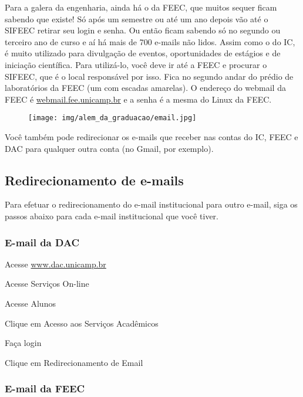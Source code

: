 Para a galera da engenharia, ainda há o da FEEC, que muitos sequer ficam
sabendo que existe! Só após um semestre ou até um ano depois vão até o SIFEEC
retirar seu login e senha. Ou então ficam sabendo só no segundo ou terceiro ano
de curso e aí há mais de 700 e-mails não lidos. Assim como o do IC, é muito
utilizado para divulgação de eventos, oportunidades de estágios e de iniciação
científica. Para utilizá-lo, você deve ir até a FEEC e procurar o SIFEEC, que é
o local responsável por isso. Fica no segundo andar do prédio de laboratórios
da FEEC (um com escadas amarelas). O endereço do webmail da FEEC é
\url{webmail.fee.unicamp.br} e a senha é a mesma do Linux da FEEC.

\begin{figure}[b!]
    \centering
    \texttt{[image: img/alem\_da\_graduacao/email.jpg]}
\end{figure}

Você também pode redirecionar os e-mails que receber nas contas do IC, FEEC e
DAC para qualquer outra conta (no Gmail, por exemplo).

\subsection{Redirecionamento de e-mails}
Para efetuar o redirecionamento do e-mail institucional para outro e-mail, siga
os passos abaixo para cada e-mail institucional que você tiver.

\subsubsection{E-mail da DAC}

\begin{compactenumerate}
    \item  Acesse \url{www.dac.unicamp.br}
    \item  Acesse Serviços On-line
    \item  Acesse Alunos
    \item  Clique em Acesso aos Serviços Acadêmicos
    \item  Faça login
    \item  Clique em Redirecionamento de Email
\end{compactenumerate}

\subsubsection{E-mail da FEEC}


